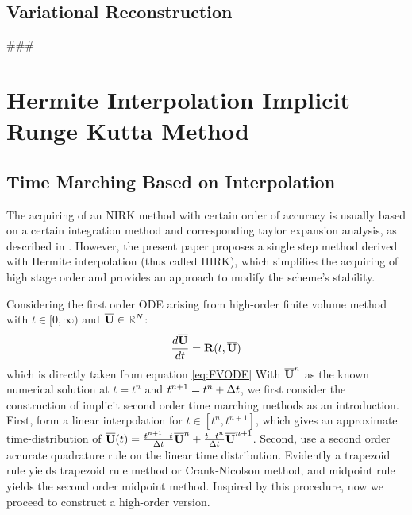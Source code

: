 \documentclass[preprint,12pt]{elsarticle}
\begin{document}
\subsection{Variational Reconstruction}
\label{ssec:VR}

\#\#\#


\section{Hermite Interpolation Implicit Runge Kutta Method}
\label{sec:HIRK}

\subsection{Time Marching Based on Interpolation}

The acquiring of an NIRK method with
certain order of accuracy is usually based on
a certain integration method and
corresponding taylor expansion analysis,
as described in \cite{kulikov2006familyNIRKOrig}.
However, the present paper proposes a single step method
derived with Hermite interpolation
(thus called HIRK),
which simplifies the acquiring of high
stage order and provides an approach to
modify the scheme's stability.

Considering the first order ODE arising from high-order finite volume method
with
$t\in[0,\infty)$ and $\overline{\mathbf{U}}\in \mathbb{R}^N$:
\begin{equation*}
    \frac{d\overline{\mathbf{U}}}{dt} = \mathbf{R}(t, \overline{\mathbf{U}})
\end{equation*}
which is directly taken from equation \eqref{eq:FVODE}
With $\overline{\mathbf{U}}^n$ as the known numerical solution at $t=t^n$ and
$t^{n+1} = t^{n} + \mathrm\Delta t$,
we first consider the construction of implicit second order
time marching methods as an introduction.
First, form a linear interpolation for $t\in[t^n, t^{n+1}]$,
which gives an approximate time-distribution of
$\overline{\mathbf{U}}(t)=\frac{t^{n+1} - t}{\mathrm\Delta t}\overline{\mathbf{U}}^n + \frac{t - t^n}{\mathrm\Delta t}\overline{\mathbf{U}}^{n+1}$.
Second, use a second order accurate quadrature rule on
the linear time distribution. Evidently a trapezoid rule yields
trapezoid rule method or Crank-Nicolson method, and
midpoint rule yields the second order midpoint method.
Inspired by this procedure, now we proceed to construct
a high-order version.
\end{document}
